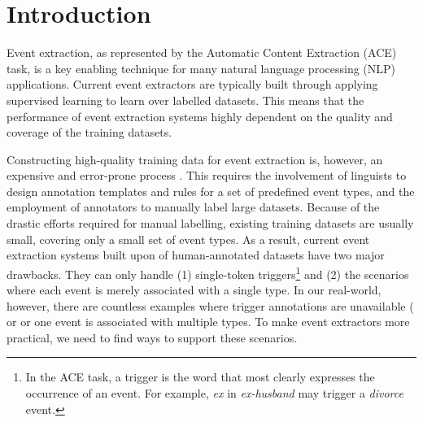 \section{Introduction}
%

Event extraction, as represented by the Automatic Content Extraction (ACE) task, is a key enabling technique for many natural language
processing (NLP) applications.  Current event extractors are typically built through applying supervised learning to learn over labelled
datasets. This means that the performance of event extraction systems highly dependent on the quality and coverage of the training
datasets.

Constructing high-quality training data for event extraction is, however, an expensive and error-prone process
\cite{aguilar2014comparison,song2015light}. This requires the involvement of linguists to design annotation templates and rules for a set
of predefined event types, and the employment of annotators to manually label  large datasets. Because of the drastic efforts required for
manual labelling, existing training datasets are usually small, covering only a small set of event types. As a result, current event
extraction systems built upon of human-annotated datasets have two major drawbacks. They can only handle (1) single-token
triggers\footnote{In the ACE task, a trigger is the word that most clearly expresses the occurrence of an event. For example, \textit{ex}
in \textit{ex-husband} may trigger a \emph{divorce} event.} and (2) the scenarios where  each event is merely associated with a single
type. In our real-world, however, there are countless examples where trigger annotations are unavailable ( or or one event is associated with multiple types. To make event extractors more practical, we need to find
ways to support these scenarios.

